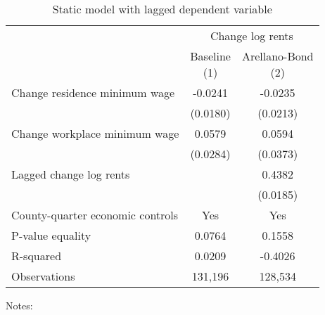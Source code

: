 \begin{table}
    \caption{Static model with lagged dependent variable}
    \label{tab:static_ab}

    \begin{tabular}{@{}lcc@{}}
        \toprule
                               & \multicolumn{2}{c}{Change log rents}                       \\ \cmidrule(l){2-3}
                               & \shortsack{Baseline\\(1)} & \shortsack{Arellano-Bond\\(2)} \\ \midrule
        Change residence minimum wage     &  -0.0241           &  -0.0235                           \\
                                          & (0.0180)          & (0.0213)                          \\
        Change workplace minimum wage     &  0.0579           & 0.0594                            \\
                                          & (0.0284)          & (0.0373)                          \\
        Lagged change log rents           &                & 0.4382                            \\
                                          &                & (0.0185)                          \\ \midrule
        County-quarter economic controls  & Yes            & Yes                            \\
        P-value equality                  & 0.0764            & 0.1558                            \\
        R-squared                         & 0.0209            & -0.4026                            \\
        Observations                      & 131,196           & 128,534                           \\ \bottomrule
    \end{tabular}

    \begin{minipage}{.95\textwidth} \footnotesize
        \vspace{2mm}
        Notes: 
    \end{minipage}
\end{table}
